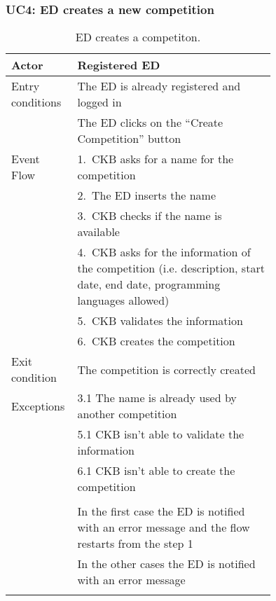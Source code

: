 \subsubsection*{UC4: ED creates a new competition}
\begin{center}
  \begin{longtable}{l|p{0.75\linewidth}}
    \hline
    Actor & Registered ED \\
    \hline
    Entry conditions & The ED is already registered and logged in  \\
    & The ED clicks on the “Create Competition” button \\
    \hline
    Event Flow & 1.\ CKB asks for a name for the competition \\
    & 2.\ The ED inserts the name \\
    & 3.\ CKB checks if the name is available \\
    & 4.\ CKB asks for the information of the competition (i.e. description, start date, end date, programming languages allowed) \\
    & 5.\ CKB validates the information \\
    & 6.\ CKB creates the competition \\
    \hline
    Exit condition & The competition is correctly created \\
    \hline
    Exceptions & 3.1 The name is already used by another competition \\
    & 5.1 CKB isn’t able to validate the information \\
    & 6.1 CKB isn’t able to create the competition \\ \\
    & In the first case the ED is notified with an error message and the flow restarts from the step 1 \\
    & In the other cases the ED is notified with an error message \\
    \hline
    \caption{ED creates a competiton.}
    \label{tab: ED_create_competition}
  \end{longtable}
\end{center}

